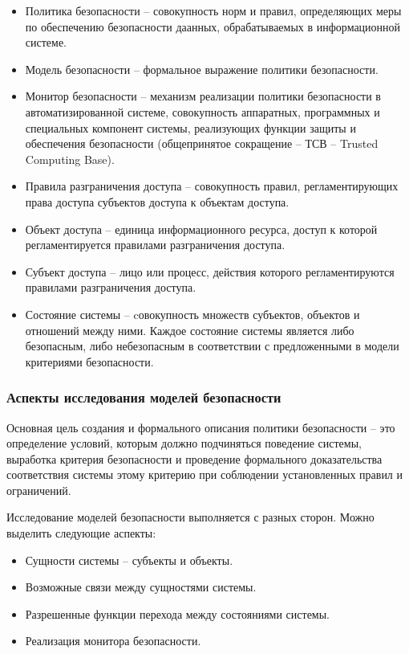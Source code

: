 \begin{itemize}
	\item Политика безопасности -- совокупность норм и правил, определяющих меры по обеспечению безопасности даанных, обрабатываемых в информационной системе.
	\item Модель безопасности -- формальное выражение политики безопасности.
	\item Монитор безопасности -- механизм реализации политики безопасности в автоматизированной системе, совокупность аппаратных, программных и специальных компонент системы, реализующих функции защиты и обеспечения безопасности (общепринятое сокращение – ТСВ – Trusted
Computing Base).
	\item Правила разграничения доступа -- совокупность правил, регламентирующих права доступа субъектов доступа к объектам доступа.
	\item Объект доступа -- единица информационного ресурса, доступ к которой регламентируется правилами разграничения доступа.
	\item Субъект доступа -- лицо или процесс, действия которого регламентируются правилами разграничения доступа.
	\item Состояние системы -- cовокупность множеств субъектов, объектов и отношений между ними. Каждое состояние системы является либо безопасным, либо небезопасным в соответствии с предложенными в модели критериями безопасности.
\end{itemize}

\subsubsection{Аспекты исследования моделей безопасности}

Основная цель создания и формального описания политики безопасности -- это определение условий, которым должно подчиняться поведение системы, выработка критерия безопасности и проведение формального доказательства соответствия системы этому критерию при соблюдении установленных правил и ограничений.

Исследование моделей безопасности выполняется с разных сторон. Можно выделить следующие аспекты:

\begin{itemize}
	\item Сущности системы -- субъекты и объекты.
	\item Возможные связи между сущностями системы.
	\item Разрешенные функции перехода между состояниями системы.
	\item Реализация монитора безопасности.
\end{itemize}

